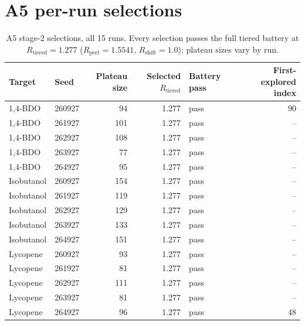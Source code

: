 \documentclass[12pt,a4paper]{article}
\begin{document}
\section{A5 per-run selections}
\begin{table}[h]
\centering
\small
\caption{A5 stage-2 selections, all 15 runs. Every selection passes the full tiered battery at $R_{\mathrm{tiered}} = 1.277$ ($R_{\mathrm{pert}} = 1.5541$, $R_{\mathrm{shift}} = 1.0$); plateau sizes vary by run.}
\label{tab:a5sel}
\begin{tabular}{l l r r l r}
\hline
Target & Seed & Plateau size & Selected $R_{\mathrm{tiered}}$ & Battery pass & First-explored index \\
\hline
1,4-BDO & 260927 & 94 & 1.277 & pass & 90 \\
1,4-BDO & 261927 & 101 & 1.277 & pass & -- \\
1,4-BDO & 262927 & 108 & 1.277 & pass & -- \\
1,4-BDO & 263927 & 77 & 1.277 & pass & -- \\
1,4-BDO & 264927 & 95 & 1.277 & pass & -- \\
Isobutanol & 260927 & 154 & 1.277 & pass & -- \\
Isobutanol & 261927 & 119 & 1.277 & pass & -- \\
Isobutanol & 262927 & 129 & 1.277 & pass & -- \\
Isobutanol & 263927 & 133 & 1.277 & pass & -- \\
Isobutanol & 264927 & 151 & 1.277 & pass & -- \\
Lycopene & 260927 & 93 & 1.277 & pass & -- \\
Lycopene & 261927 & 81 & 1.277 & pass & -- \\
Lycopene & 262927 & 111 & 1.277 & pass & -- \\
Lycopene & 263927 & 81 & 1.277 & pass & -- \\
Lycopene & 264927 & 96 & 1.277 & pass & 48 \\
\hline
\end{tabular}
\end{table}
\end{document}
